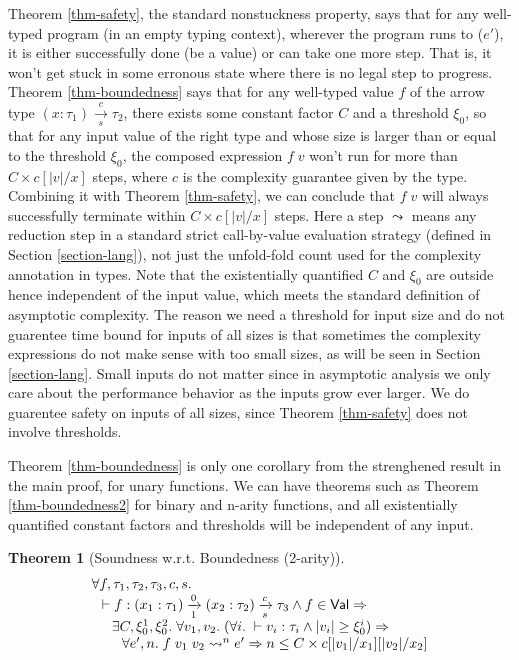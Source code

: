 \documentclass[preprint]{sigplanconf}
\newcommand{\arrow}[4]{#1\xrightarrow[#3]{#2}#4}
\newtheorem{thm}{Theorem}
\begin{document}
Theorem \ref{thm-safety}, the standard nonstuckness property, says that for any well-typed program (in an empty typing context), wherever the program runs to ($e'$), it is either successfully done (be a value) or can take one more step. That is, it won't get stuck in some erronous state where there is no legal step to progress. Theorem \ref{thm-boundedness} says that for any well-typed value $f$ of the arrow type $\arrow{(x:\tau_1)}{c}{s}{\tau_2}$, there exists some constant factor $C$ and a threshold $\xi_0$, so that for any input value of the right type and whose size is larger than or equal to the threshold $\xi_0$, the composed expression $f\;v$ won't run for more than $C\times c[|v|/x]$ steps, where $c$ is the complexity guarantee given by the type. Combining it with Theorem \ref{thm-safety}, we can conclude that $f\;v$ will always successfully terminate within $C\times c[|v|/x]$ steps. Here a step $\leadsto$ means any reduction step in a standard strict call-by-value evaluation strategy (defined in Section \ref{section-lang}), not just the unfold-fold count used for the complexity annotation in types. Note that the existentially quantified $C$ and $\xi_0$ are outside hence independent of the input value, which meets the standard definition of asymptotic complexity. The reason we need a threshold for input size and do not guarentee time bound for inputs of all sizes is that sometimes the complexity expressions do not make sense with too small sizes, as will be seen in Section \ref{section-lang}. Small inputs do not matter since in asymptotic analysis we only care about the performance behavior as the inputs grow ever larger. We do guarentee safety on inputs of all sizes, since Theorem \ref{thm-safety} does not involve thresholds.

Theorem \ref{thm-boundedness} is only one corollary from the strenghened result in the main proof, for unary functions. We can have theorems such as Theorem \ref{thm-boundedness2} for binary and n-arity functions, and all existentially quantified constant factors and thresholds will be independent of any input.

\begin{thm}[\label{thm-boundedness2}Soundness w.r.t. Boundedness (2-arity)]
$$
\begin{array}{l}
\forall f,\tau_1,\tau_2,\tau_3,c,s. \\
\hspace{0.1in} \vdash f:\arrow{(x_1:\tau_1)}{0}{1}{\arrow{(x_2:\tau_2)}{c}{s}{\tau_3}} \wedge f\in\mathsf{Val}\Rightarrow \\
\hspace{0.2in} \exists C,\xi_0^1,\xi_0^2. \;\forall v_1,v_2.\; (\forall i.\;\vdash v_i:\tau_i \wedge |v_i| \geq \xi_0^i) \Rightarrow \\
\hspace{0.3in} \forall e',n.\; f\;v_1\;v_2\leadsto^n e' \Rightarrow n\leq C\times c[|v_1|/x_1][|v_2|/x_2]
\end{array}
$$
\end{thm}
\end{document}

